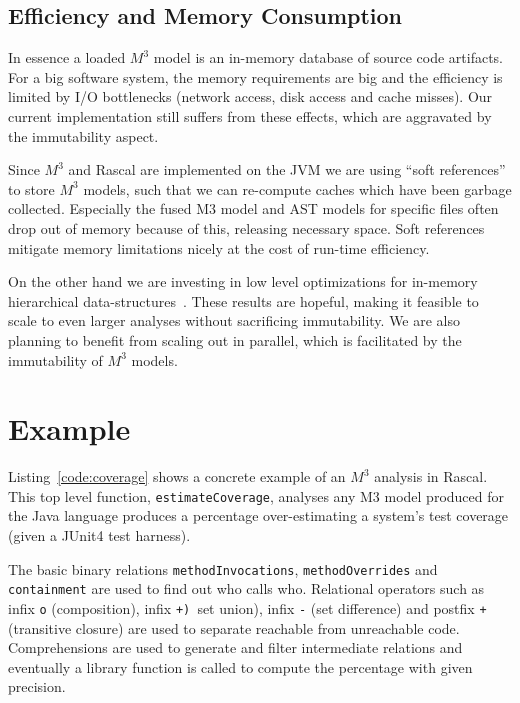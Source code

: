 \documentclass[conference]{IEEEtran}
\newcommand{\mthree}{\ensuremath{M^3}\xspace}
\begin{document}

\subsection{Efficiency and Memory Consumption}

In essence a loaded \mthree model is an in-memory database of source code artifacts. For a big software system, the memory requirements are big and the efficiency is limited by I/O bottlenecks (network access, disk access and cache misses). Our current implementation still suffers from these effects, which are aggravated by the immutability aspect.

Since \mthree and Rascal are implemented on the JVM we are using ``soft references'' to store \mthree models, such that we can re-compute caches which have been garbage collected. Especially the fused M3 model and AST models for specific files often drop out of memory because of this, releasing necessary space. Soft references mitigate memory limitations nicely at the cost of run-time efficiency.

On the other hand we are investing in low level optimizations for in-memory hierarchical data-structures~\cite{BJKO00,gpce}. These results are hopeful, making it feasible to scale to even larger analyses without sacrificing immutability. We are also planning to benefit from scaling out in parallel, which is facilitated by the immutability of \mthree models. 

\section{Example}

Listing~\ref{code:coverage} shows a concrete example of an \mthree analysis in Rascal. This top level function, \lstinline{estimateCoverage}, analyses any M3 model produced for the Java language produces a percentage over-estimating a system's test coverage  (given a JUnit4 test harness). 

The basic binary relations \lstinline{methodInvocations},  \lstinline{methodOverrides} and \lstinline{containment} are used to find out who calls who. Relational operators such as infix \lstinline{o} (composition), infix \lstinline(+) (set union), infix \lstinline{-} (set difference) and postfix \lstinline{+} (transitive closure) are used to separate reachable from unreachable code. Comprehensions are used to generate and filter intermediate relations and eventually a library function is called to compute the percentage with given precision. 
\end{document}
